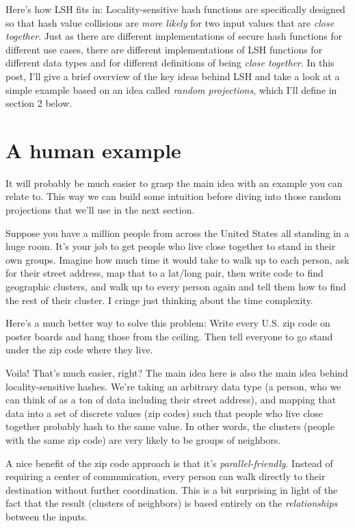 \documentclass[20pt,]{extarticle}
\begin{document}
Here's how LSH fits in: Locality-sensitive hash functions are
specifically designed so that hash value collisions are \emph{more
likely} for two input values that are \emph{close together}. Just as
there are different implementations of secure hash functions for
different use cases, there are different implementations of LSH
functions for different data types and for different definitions of
being \emph{close together}. In this post, I'll give a brief overview of
the key ideas behind LSH and take a look at a simple example based on an
idea called \emph{random projections}, which I'll define in section 2
below.

\section{A human example}\label{a-human-example}

It will probably be much easier to grasp the main idea with an example
you can relate to. This way we can build some intuition before diving
into those random projections that we'll use in the next section.

Suppose you have a million people from across the United States all
standing in a huge room. It's your job to get people who live close
together to stand in their own groups. Imagine how much time it would
take to walk up to each person, ask for their street address, map that
to a lat/long pair, then write code to find geographic clusters, and
walk up to every person again and tell them how to find the rest of
their cluster. I cringe just thinking about the time complexity.

Here's a much better way to solve this problem: Write every U.S. zip
code on poster boards and hang those from the ceiling. Then tell
everyone to go stand under the zip code where they live.

Voila! That's much easier, right? The main idea here is also the main
idea behind locality-sensitive hashes. We're taking an arbitrary data
type (a person, who we can think of as a ton of data including their
street address), and mapping that data into a set of discrete values
(zip codes) such that people who live close together probably hash to
the same value. In other words, the clusters (people with the same zip
code) are very likely to be groups of neighbors.

A nice benefit of the zip code approach is that it's
\emph{parallel-friendly}. Instead of requiring a center of
communication, every person can walk directly to their destination
without further coordination. This is a bit surprising in light of the
fact that the result (clusters of neighbors) is based entirely on the
\emph{relationships} between the inputs.
\end{document}

